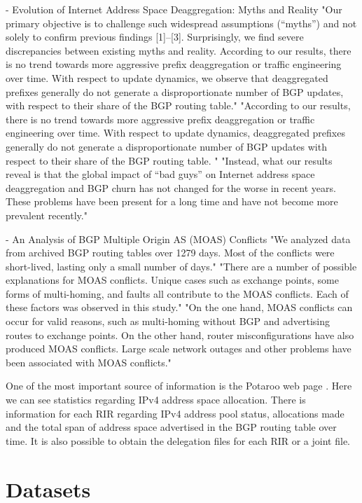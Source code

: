 \documentclass[11pt,a4paper]{scrreprt}
\begin{document}
- Evolution of Internet Address Space Deaggregation: Myths and Reality
"Our primary objective is to challenge such widespread assumptions (“myths”) and not solely to confirm previous findings [1]–[3]. Surprisingly, we find severe discrepancies between existing myths and reality. According to our results, there is no trend towards more aggressive prefix deaggregation or traffic engineering over time. With respect to update dynamics, we observe that deaggregated prefixes generally do not generate a disproportionate number of BGP updates, with respect to their share of the BGP routing table."
"According to our results, there is no trend towards more aggressive prefix deaggregation or traffic engineering over time. With respect to update dynamics, deaggregated prefixes generally do not generate a
disproportionate number of BGP updates with respect to their share of the BGP routing table. "
"Instead, what our results reveal is that the global impact of “bad guys” on Internet address space deaggregation and BGP churn has not changed for the worse in recent years. These problems have been present for a long time and have not become more prevalent recently."


- An Analysis of BGP Multiple Origin AS (MOAS) Conflicts
"We analyzed data from archived BGP routing tables over 1279 days. Most of the conflicts
were short-lived, lasting only a small number of days."
"There are a number of possible explanations for MOAS conflicts. Unique cases such as exchange points, some
forms of multi-homing, and faults all contribute to the MOAS conflicts. Each of these factors was observed in this study."
"On the one hand, MOAS conflicts can occur for valid reasons, such as multi-homing without BGP and advertising routes to exchange points. On the other hand, router misconfigurations have also produced MOAS conflicts. Large scale network outages and other problems have been associated with MOAS conflicts." 






One of the most important source of information is the Potaroo web page \cite{Potaroo}. 
Here we can see statistics regarding IPv4 address space allocation. There is information for each RIR regarding IPv4 address pool status, allocations made and the total span of address space advertised in the BGP routing table over time. It is also possible to obtain the delegation files for each RIR or a joint file.


\chapter{Datasets}
\end{document}
